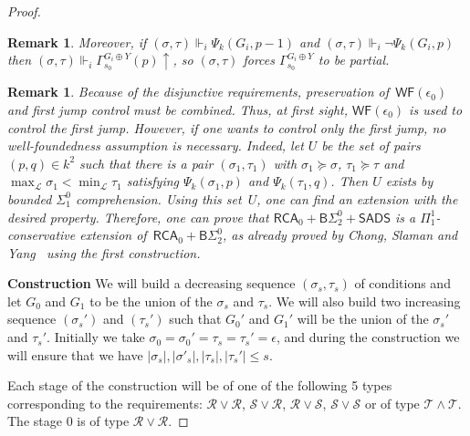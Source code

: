 \documentclass{article}
\numberwithin{theorem}{section}
\newtheorem{remark}[theorem]{Remark}
\newcommand{\RCA}{\mathsf{RCA}}
\newcommand{\SADS}{\mathsf{SADS}}
\newcommand{\BSig}{\mathsf{B}\Sigma^0}
\newcommand{\WF}{\mathsf{WF}}
\renewcommand{\L}{\mathcal{L}}
\newcommand{\R}{\mathcal{R}}
\renewcommand{\S}{\mathcal{S}}
\renewcommand{\P}{\mathcal{P}}
\renewcommand{\P}{\mathcal{P}}
\newcommand{\Q}{\mathcal{Q}}
\begin{document}
\begin{proof}
\begin{remark}
Moreover, if $(\sigma, \tau) \Vdash_i  \Psi_k(G_i,p-1)$ and $(\sigma, \tau) \Vdash_i \neg \Psi_k(G_i,p)$ then $(\sigma, \tau) \Vdash_i \Gamma_{s_0}^{G_i \oplus Y}(p) \uparrow$, so $(\sigma, \tau)$ forces $\Gamma_{s_0}^{G_i \oplus Y}$ to be partial. 
\end{remark}

\begin{remark}
Because of the disjunctive requirements, preservation of~$\WF(\epsilon_0)$ and first jump control must be combined. Thus, at first sight, $\WF(\epsilon_0)$ is used to control the first jump. However, if one wants to control only the first jump, no well-foundedness assumption is necessary. Indeed, let $U$ be the set of pairs $(p,q) \in k^2$ such that there is a pair $(\sigma_1, \tau_1)$ with $\sigma_1 \succeq \sigma$, $\tau_1 \succeq \tau$ and $\max_\L \sigma_1 < \min_\L \tau_1$ satisfying $\Psi_k(\sigma_1, p)$ and $\Psi_k(\tau_1, q)$. Then $U$ exists by bounded $\Sigma^0_1$ comprehension. Using this set~$U$, one can find an extension with the desired property. Therefore, one can prove that $\RCA_0 + \BSig_2 + \SADS$ is a $\Pi^1_1$-conservative extension of~$\RCA_0 + \BSig_2$, as already proved by Chong, Slaman and Yang~\cite{chong2021pi11} using the first construction.
\end{remark}
\smallskip

\textbf{Construction} We will build a decreasing sequence $(\sigma_s,\tau_s)$ of conditions and let $G_0$ and $G_1$ to be the union of the $\sigma_s$ and $\tau_s$. We will also build two increasing sequence $(\sigma_s')$ and $(\tau_s')$ such that $G_0'$ and $G_1'$ will be the union of the $\sigma_s'$ and $\tau_s'$. Initially we take $\sigma_0 = \sigma_0' = \tau_s = \tau_s' = \epsilon$, and during the construction we will ensure that we have $|\sigma_s|,|\sigma'_s|,|\tau_s|,|\tau_s'| \leq s$. 



Each stage of the construction will be of one of the following 5 types corresponding to the requirements: $\R \vee \R$, $\S \vee \R$, $\R \vee \S$, $\S \vee \S$ or of type $\mathcal{T} \wedge \mathcal{T}$. The stage $0$ is of type $\R \vee \R$.


\end{proof}
\end{document}

